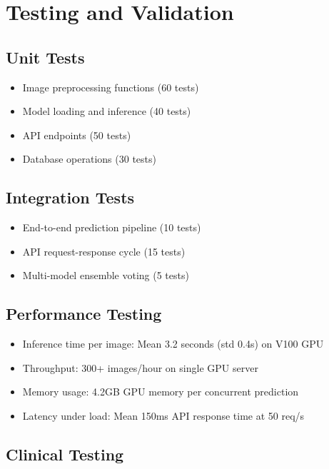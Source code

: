 {\section{Testing and Validation}

\subsection{Unit Tests}

\begin{itemize}
    \item Image preprocessing functions (60 tests)
    \item Model loading and inference (40 tests)
    \item API endpoints (50 tests)
    \item Database operations (30 tests)
\end{itemize}

\subsection{Integration Tests}

\begin{itemize}
    \item End-to-end prediction pipeline (10 tests)
    \item API request-response cycle (15 tests)
    \item Multi-model ensemble voting (5 tests)
\end{itemize}

\subsection{Performance Testing}

\begin{itemize}
    \item Inference time per image: Mean 3.2 seconds (std 0.4s) on V100 GPU
    \item Throughput: 300+ images/hour on single GPU server
    \item Memory usage: 4.2GB GPU memory per concurrent prediction
    \item Latency under load: Mean 150ms API response time at 50 req/s
\end{itemize}

\subsection{Clinical Testing}

}
